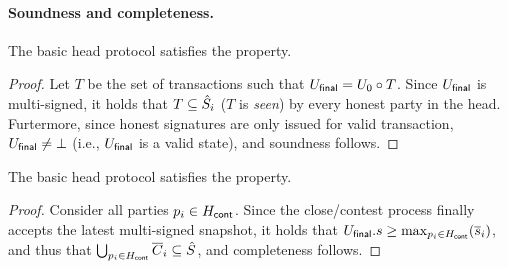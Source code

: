 \paragraph{Soundness and completeness.}

\begin{lemma}[Soundness]
  \label{lem:soundness}
  The basic head protocol satisfies the  property.
\end{lemma}

\begin{proof}
  Let $T$ be the set of transactions such that $U_{\mathsf{final}}=U_0\circ T$.
  Since $U_{\mathsf{final}}$ is multi-signed, it holds that $T\subseteq\hat{S}_i$
  ($T$ is \emph{seen}) by every honest party in the head.
  Furtermore, since honest signatures are only issued for valid transaction,
  $U_{\mathsf{final}}\not=\bot$ (i.e., $U_{\mathsf{final}}$ is a valid state), and soundness
  follows.
\end{proof}


\begin{lemma}[Completeness]
 \label{lem:completeness}
 The basic head protocol satisfies the 
 property.
\end{lemma}
\begin{proof}
  Consider all parties $p_i\in H_{\mathsf{cont}}$. Since the close/contest process
  finally accepts the latest multi-signed snapshot, it holds that
  $U_{\mathsf{final}}.s \geq \max_{p_i\in H_{\mathsf{cont}}}(\overline s_i)$, and thus that
  $\bigcup_{p_i\in H_{\mathsf{cont}}}\overline{C}_i\subseteq\hat{S}$,
  and completeness follows.
\end{proof}
